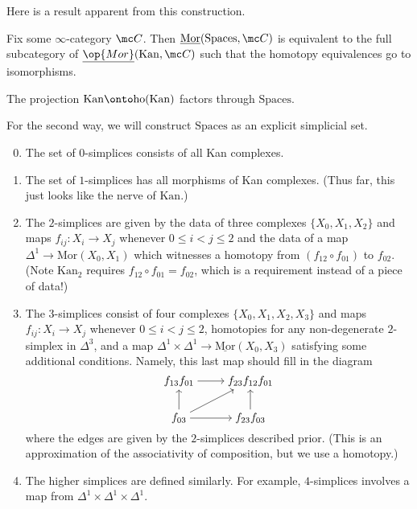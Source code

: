 \documentclass[../notes.tex]{subfiles}
\begin{document}
Here is a result apparent from this construction.
\begin{proposition}
	Fix some $\infty$-category $\mc C$. Then $\underline{\mathrm{Mor}}(\mathrm{Spaces},\mc C)$ is equivalent to the full subcategory of $\underline{\op{Mor}}(\mathrm{Kan},\mc C)$ such that the homotopy equivalences go to isomorphisms.
\end{proposition}
\begin{corollary}
	The projection $\mathrm{Kan}\onto\mathrm{ho}(\mathrm{Kan})$ factors through $\mathrm{Spaces}$.
\end{corollary}
For the second way, we will construct $\mathrm{Spaces}$ as an explicit simplicial set.
\begin{enumerate}
	\setcounter{enumi}{-1}
	\item The set of $0$-simplices consists of all Kan complexes.
	\item The set of $1$-simplices has all morphisms of Kan complexes. (Thus far, this just looks like the nerve of $\mathrm{Kan}$.)
	\item The $2$-simplices are given by the data of three complexes $\{X_0,X_1,X_2\}$ and maps $f_{ij}\colon X_i\to X_j$ whenever $0\le i<j\le2$ and the data of a map $\Delta^1\to\mathrm{Mor}(X_0,X_1)$ which witnesses a homotopy from $(f_{12}\circ f_{01})$ to $f_{02}$. (Note $\mathrm{Kan}_2$ requires $f_{12}\circ f_{01}=f_{02}$, which is a requirement instead of a piece of data!)
	\item The $3$-simplices consist of four complexes $\{X_0,X_1,X_2,X_3\}$ and maps $f_{ij}\colon X_i\to X_j$ whenever $0\le i<j\le2$, homotopies for any non-degenerate $2$-simplex in $\Delta^3$, and a map $\Delta^1\times\Delta^1\to\underline{\mathrm{Mor}}(X_0,X_3)$ satisfying some additional conditions. Namely, this last map should fill in the diagram
	\[\begin{tikzcd}[cramped]
		{f_{13}f_{01}} & {f_{23}f_{12}f_{01}} \\
		{f_{03}} & {f_{23}f_{03}}
		\arrow[from=1-1, to=1-2]
		\arrow[from=2-1, to=1-1]
		\arrow[from=2-1, to=1-2]
		\arrow[from=2-1, to=2-2]
		\arrow[from=2-2, to=1-2]
	\end{tikzcd}\]
	where the edges are given by the $2$-simplices described prior. (This is an approximation of the associativity of composition, but we use a homotopy.)
	\item The higher simplices are defined similarly. For example, $4$-simplices involves a map from $\Delta^1\times\Delta^1\times\Delta^1$.
\end{enumerate}
\end{document}
